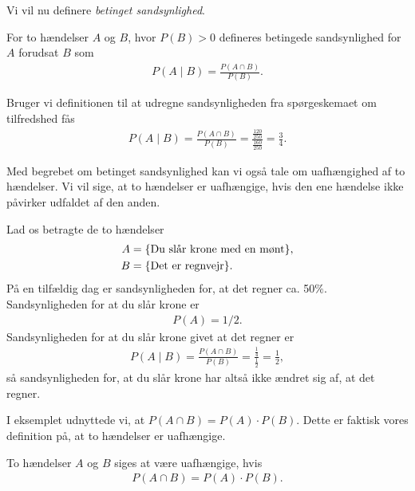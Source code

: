 Vi vil nu definere \textit{betinget sandsynlighed}.
\begin{defn}
	For to hændelser $A$ og $B$, hvor $P(B)> 0$ defineres betingede sandsynlighed for $A$ forudsat $B$ som
	\begin{align*}
		P(A \mid B) = \frac{P(A \cap B)}{P(B)}.
	\end{align*}
\end{defn}

\begin{exa}
	Bruger vi definitionen til at udregne sandsynligheden fra spørgeskemaet om tilfredshed fås
	\begin{align*}
		P(A \mid B) = \frac{P(A \cap B)}{P(B)} = \frac{\frac{120}{250}}{\frac{160}{250}} = \frac{3}{4}.
	\end{align*}
\end{exa}

Med begrebet om betinget sandsynlighed kan vi også tale om uafhængighed af to hændelser. Vi vil sige, at to hændelser er uafhængige, hvis den ene hændelse ikke påvirker udfaldet af den anden. 

\begin{exa}
	Lad os betragte de to hændelser
		\begin{align*}
			A &= \{\textnormal{Du slår krone med en mønt}\}, \\
			B &= \{\textnormal{Det er regnvejr}\}.
		\end{align*}
	På en tilfældig dag er sandsynligheden for, at det regner ca. 50$\%$. 
	Sandsynligheden for at du slår krone er
	\begin{align*}
		P(A) = 1/2.
	\end{align*}
	Sandsynligheden for at du slår krone givet at det regner er
	\begin{align*}
		P(A \mid B) = \frac{P(A \cap B)}{P(B)} = \frac{\frac{1}{4}}{\frac{1}{2}} = \frac{1}{2},
	\end{align*}
	så sandsynligheden for, at du slår krone har altså ikke ændret sig af, at det regner. 
\end{exa}

I eksemplet udnyttede vi, at $P(A \cap B) = P(A)\cdot P(B)$. Dette er faktisk vores definition på, at to hændelser er uafhængige.
\begin{defn}[Uafhængighed]
	To hændelser $A$ og $B$ siges at være uafhængige, hvis 
	\begin{align*}
		P(A \cap B) = P(A)\cdot P(B).
	\end{align*}
\end{defn}

